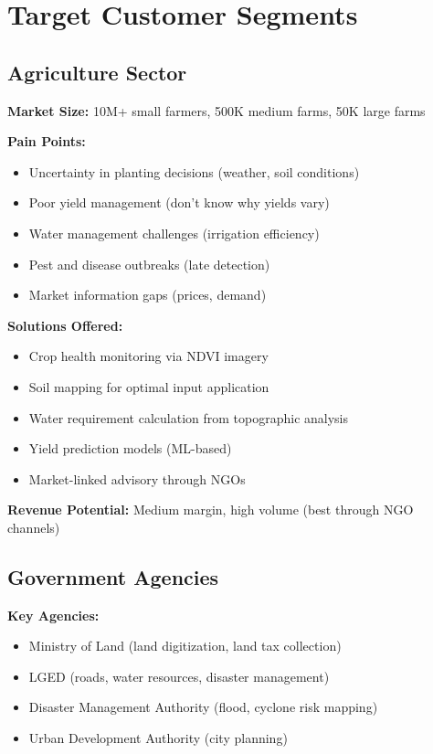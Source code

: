 \section{Target Customer Segments}

\subsection{Agriculture Sector}

\textbf{Market Size:} 10M+ small farmers, 500K medium farms, 50K large farms

\textbf{Pain Points:}
\begin{itemize}
    \item Uncertainty in planting decisions (weather, soil conditions)
    \item Poor yield management (don't know why yields vary)
    \item Water management challenges (irrigation efficiency)
    \item Pest and disease outbreaks (late detection)
    \item Market information gaps (prices, demand)
\end{itemize}

\textbf{Solutions Offered:}
\begin{itemize}
    \item Crop health monitoring via NDVI imagery
    \item Soil mapping for optimal input application
    \item Water requirement calculation from topographic analysis
    \item Yield prediction models (ML-based)
    \item Market-linked advisory through NGOs
\end{itemize}

\textbf{Revenue Potential:} Medium margin, high volume (best through NGO channels)

\subsection{Government Agencies}

\textbf{Key Agencies:}
\begin{itemize}
    \item Ministry of Land (land digitization, land tax collection)
    \item LGED (roads, water resources, disaster management)
    \item Disaster Management Authority (flood, cyclone risk mapping)
    \item Urban Development Authority (city planning)
\end{itemize}

